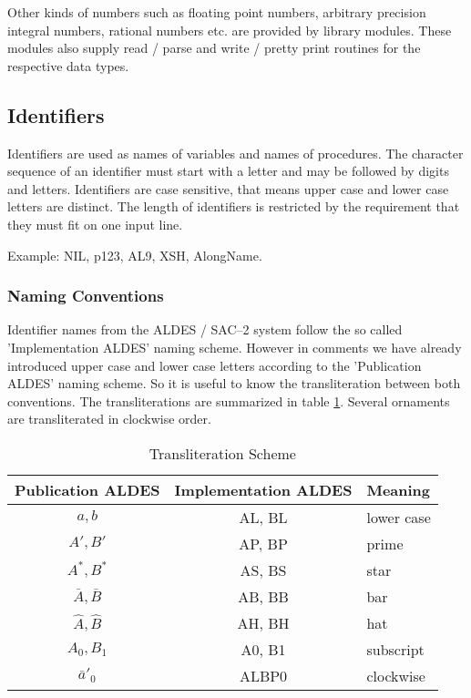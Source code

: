 Other kinds of numbers such as floating point numbers,
arbitrary precision integral numbers, rational numbers etc.
are provided by library modules. 
These modules also supply read / parse 
and write / pretty print routines for the respective data types.


\subsection{Identifiers}

Identifiers are used as names of variables and names of 
procedures. 
The character sequence of an identifier
must start with a letter and may be 
followed by digits and letters.
Identifiers are case sensitive, that means upper case
and lower case letters are distinct.
The length of identifiers is restricted by the 
requirement that they must fit on one input line.

Example: NIL, p123, AL9, XSH, AlongName.

\subsubsection{Naming Conventions}

Identifier names from the ALDES / SAC--2 system
follow the so called 'Implementation ALDES' naming
scheme. However in comments we have already introduced 
upper case and lower case letters according to the
'Publication ALDES' naming scheme. 
So it is useful to know the transliteration between
both conventions.
The transliterations are summarized in table \ref{tabTS}.
Several ornaments are transliterated in clockwise order.

\begin{table}[thbp] %
\begin{center}
\begin{tabular}{|c|c|l|}   
\hline
Publication ALDES   & Implementation ALDES & Meaning \\
\hline
$a, b$              & AL, BL               & lower case \\
$A', B'$            & AP, BP               & prime \\
$A^{*}, B^{*}$      & AS, BS               & star \\
$\bar{A}, \bar{B}$  & AB, BB               & bar \\
$\hat{A}, \hat{B}$  & AH, BH               & hat \\
$A_0,B_1$           & A0, B1               & subscript \\
$\bar{a}'_0$        & ALBP0                & clockwise \\
\hline
\end{tabular}
\end{center}
\label{tabTS}
\caption{Transliteration Scheme}
\end{table}


